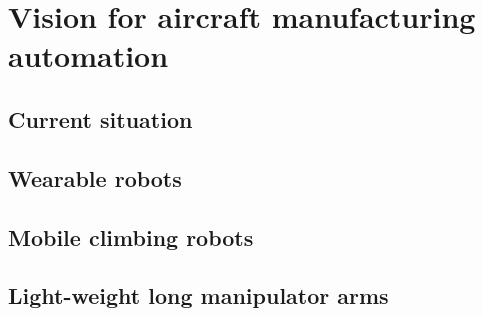 \chapter{Vision for aircraft manufacturing automation}
\label{sec:VisionForAircraftManufacturingAutomation}



\section{Current situation}
\label{sec:CurrentSituation}


\section{Wearable robots}
\label{sec:WearableRobots}


\section{Mobile climbing robots}
\label{sec:MobileClimbingRobots}


\section{Light-weight long manipulator arms}
\label{sec:LightWeightLongManipulatorArm}


